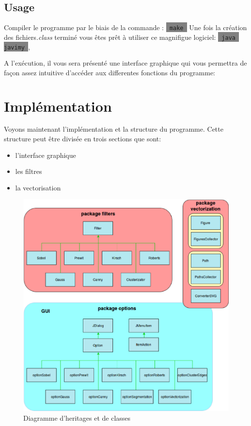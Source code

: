 \documentclass[twoside,openright,a4paper,11pt,french]{article}
\begin{document}
\bigbreak
\subsection{Usage}
Compiler le programme par le biais de la commande : 
\colorbox{gray}{\lstinline[basicstyle=\ttfamily\color{black}]| make |}
Une fois la création des fichiers{\it .class} terminé vous êtes prêt
à utiliser ce magnifigue logiciel: 
\colorbox{gray}{\lstinline[basicstyle=\ttfamily\color{black}]| java javimy |},

\vspace{1cm}
A l'exécution, il vous sera présenté une interface graphique qui vous
permettra de façon assez intuitive d'accéder aux differentes fonctions
du programme:

\begin{center}
\end{center}

\newpage 
\section{Implémentation}
Voyons maintenant l'implémentation et la structure du programme.
Cette structure peut être divisée en trois sections que sont:
\begin{itemize}
\item l'interface graphique
\item les filtres
\item la vectorisation
\end{itemize}

\begin{figure}[h]
\centering
\includegraphics[width=12cm]{./pics/classes.eps}
\caption{Diagramme d’heritages et de classes}
\end{figure}
\end{document}
